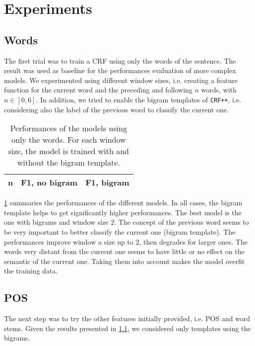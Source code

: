 \section{Experiments}
\label{sec:experiments}

\subsection{Words}
\label{subsection:words}
The first trial was to train a \ac{CRF} using only the words of the sentence.
The result was used as baseline for the performances evaluation of more complex models.
We experimented using different window sizes, i.e. creating a feature function for the current word and the preceding and following $n$ words, with $n \in [0,6]$.
In addition, we tried to enable the bigram templates of \texttt{CRF++}, i.e. considering also the label of the previous word to classify the current one. 

\begin{table}[h]
	\centering
    \begin{tabular}{ c c c }
    	\toprule
    		\multicolumn{1}{c}{n} & \multicolumn{1}{c}{F1, no bigram} & \multicolumn{1}{c}{F1, bigram} \\
    	\midrule
            
    	\bottomrule
	\end{tabular}
    \caption{Performances of the models using only the words. For each window size, the model is trained with and without the bigram template.}
	\label{tab:words}
\end{table}

\cref{tab:words} summaries the performances of the different models.
In all cases, the bigram template helps to get significantly higher performances.
The best model is the one with bigrams and window size $2$.
The concept of the previous word seems to be very important to better classify the current one (bigram template).
The performances improve window a size up to $2$, then degrades for larger ones.
The words very distant from the current one seems to have little or no effect on the semantic of the current one.
Taking them into account makes the model overfit the training data.

\subsection{POS}
\label{subsection:pos}
The next step was to try the other features initially provided, i.e. \ac{POS} and word stems.
Given the results presented in \cref{subsection:words}, we considered only templates using the bigrams.


